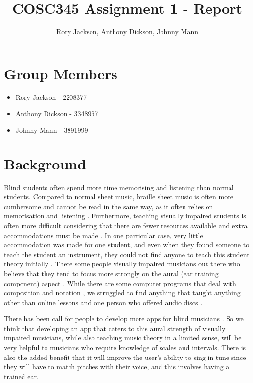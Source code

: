 \documentclass{article}
\title{COSC345 Assignment 1 - Report}
\author{Rory Jackson, Anthony Dickson, Johnny Mann}
\begin{document}
	
\maketitle
\tableofcontents

\section{Group Members}
\begin{itemize}
	\item Rory Jackson - 2208377
	\item Anthony Dickson - 3348967
	\item Johnny Mann - 3891999
\end{itemize}
	

\section{Background}
Blind students often spend more time memorising and listening than normal students. Compared to normal sheet music, braille sheet music is often more cumbersome and cannot be read in the same way, as it often relies on memorisation and listening \cite{teachingcollege}. Furthermore, teaching visually impaired students is often more difficult considering that there are fewer resources available and extra accommodations must be made \cite{mtosmt}. In one particular case, very little accommodation was made for one student, and even when they found someone to teach the student an instrument, they could not find anyone to teach this student theory initially \cite{thestar}. There some people visually impaired musicians out there who believe that they tend to focus more strongly on the aural (ear training component) aspect \cite{stuff, ncbi}. While there are some computer programs that deal with composition and notation \cite{nydailynews}, we struggled to find anything that taught anything other than online lessons and one person who offered audio discs \cite{musicfortheblind}. 

There has been call for people to develop more apps for blind musicians \cite{cdm}. So we think that developing an app that caters to this aural strength of visually impaired musicians, while also teaching music theory in a limited sense, will be very helpful to musicians who require knowledge of scales and intervals. There is also the added benefit that it will improve the user's ability to sing in tune since they will have to match pitches with their voice, and this involves having a trained ear.
\end{document}
